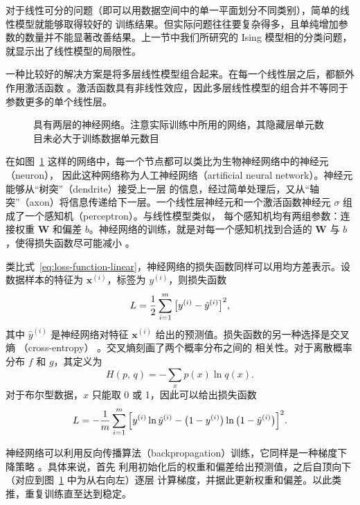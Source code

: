 对于线性可分的问题（即可以用数据空间中的单一平面划分不同类别），简单的线性模型就能够取得较好的
训练结果。但实际问题往往要复杂得多，且单纯增加参数的数量并不能显著改善结果。上一节中我们所研究的
Ising 模型相的分类问题，就显示出了线性模型的局限性。

一种比较好的解决方案是将多层线性模型组合起来。在每一个线性层之后，都额外作用激活函数
\cite{zhouzhihua}。激活函数具有非线性效应，因此多层线性模型的组合并不等同于参数更多的单个线性层。

\begin{figure}[htb]
  \centering
  \caption{具有两层的神经网络。注意实际训练中所用的网络，其隐藏层单元数目未必大于训练数据单元数目}
  \label{fig:neural-net}
\end{figure}

在如图~\ref{fig:neural-net} 这样的网络中，每一个节点都可以类比为生物神经网络中的神经元（neuron），
因此这种网络称为人工神经网络（artificial neural network）。神经元能够从“树突”（dendrite）接受上一层
的信息，经过简单处理后，又从“轴突”（axon）将信息传递给下一层。一个线性层神经元和一个激活函数神经元
$\sigma$ 组成了一个感知机（perceptron）\cite{zhouzhihua,nielsen2015neural}。与线性模型类似，
每个感知机均有两组参数：连接权重 $\bm{W}$ 和偏差 $b$。神经网络的训练，就是对每一个感知机找到合适的
$\bm{W}$ 与 $b$，使得损失函数尽可能减小 \cite{zhouzhihua}。

类比式~\eqref{eq:loss-function-linear}，神经网络的损失函数同样可以用均方差表示。设数据样本的特征为
$\bm{x}^{(i)}$，标签为 $y^{(i)}$，则损失函数 \cite{zhouzhihua,nielsen2015neural}
\begin{equation}
  L = \frac{1}{2} \sum_{i=1}^m \qty\big[y^{(i)} - \hat{y}^{(i)}]^2,
\end{equation}
其中 $\hat{y}^{(i)}$ 是神经网络对特征 $\bm{x}^{(i)}$ 给出的预测值。损失函数的另一种选择是交叉熵
（cross-entropy） \cite{nielsen2015neural,goodfellow2016deep}。交叉熵刻画了两个概率分布之间的
相关性。对于离散概率分布 $f$ 和 $g$，其定义为
\begin{equation}
  H(p,\,q) = - \sum_x p(x) \ln q(x).
\end{equation}
对于布尔型数据，$x$ 只能取 0 或 1，因此可以给出损失函数 \cite{nielsen2015neural}
\begin{equation}
  L = - \frac{1}{m} \sum_{i=1}^m
        \qty\Big[y^{(i)}\ln\hat{y}^{(i)} - \qty\big(1-y^{(i)})\ln\qty\big(1-\hat{y}^{(i)})]^2.
\end{equation}

神经网络可以利用反向传播算法（backpropagation）训练，它同样是一种梯度下降策略
\cite{zhouzhihua,nielsen2015neural,lecun2015deep}。具体来说，首先
利用初始化后的权重和偏差给出预测值，之后自顶向下（对应到图~\ref{fig:neural-net} 中为从右向左）逐层
计算梯度，并据此更新权重和偏差。以此类推，重复训练直至达到稳定。

